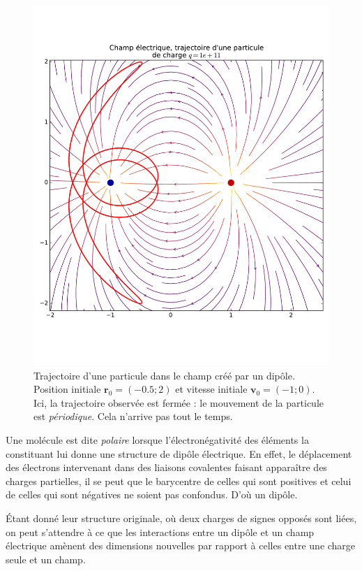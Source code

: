 \documentclass{article}
\newcommand{\vv}[1]{\symbf{#1}}
\theoremstyle{definition}
\theoremstyle{remark}
\begin{document}
\begin{figure}[h]
	\centering
	\includegraphics[height=0.9\textheight]{parts/electrostat/traj_x0_-05_2_v0_-1_0.pdf}
	\caption{Trajectoire d'une particule dans le champ créé par un dipôle. Position initiale $\vv{r}_0 = (\num{-0.5};2)$ et vitesse initiale $\vv{v}_0=(-1;0)$. Ici, la trajectoire observée est fermée : le mouvement de la particule est \textit{périodique}. Cela n'arrive pas tout le temps.}
\end{figure}

Une molécule est dite \textit{polaire} lorsque l'électronégativité des éléments la constituant lui donne une structure de dipôle électrique. En effet, le déplacement des électrons intervenant dans des liaisons covalentes faisant apparaître des charges partielles, il se peut que le barycentre de celles qui sont positives et celui de celles qui sont négatives ne soient pas confondus. D'où un dipôle.


Étant donné leur structure originale, où deux charges de signes opposés sont liées, on peut s'attendre à ce que les interactions entre un dipôle et un champ électrique amènent des dimensions nouvelles par rapport à celles entre une charge seule et un champ.
\end{document}
